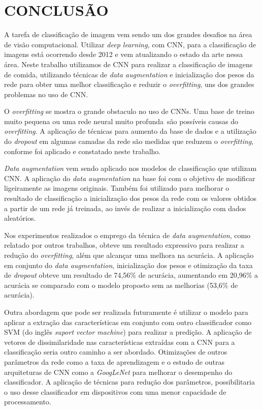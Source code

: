 
\chapter{CONCLUSÃO}
\label{chap:conclusao}

A tarefa de classificação de imagem vem sendo um dos grandes desafios na área de visão computacional. Utilizar \textit{deep learning}, com CNN, para a classificação de imagens está ocorrendo desde 2012 e vem atualizando o estado da arte nessa área. Neste trabalho utilizamos de CNN para realizar a classificação de imagens de comida, utilizando técnicas de \textit{data augmentation} e inicialização dos pesos da rede para obter uma melhor classificação e reduzir o \textit{overfitting}, uns dos grandes problemas no uso de CNN.
\par O \textit{overfitting} se mostra o grande obstaculo no uso de CNNs. Uma base de treino muito pequena ou uma rede neural muito profunda~são possíveis causas do \textit{overfitting}. A aplicação de técnicas para aumento da base de dados e a utilização do \textit{dropout} em algumas camadas da rede são medidas que reduzem o \textit{overfitting}, conforme foi aplicado e constatado neste trabalho.
\par \textit{Data augmentation} vem sendo aplicado nos modelos de classificação que utilizam CNN. A aplicação do \textit{data augmentation} na base foi com o objetivo de modificar ligeiramente as imagens originais. Também foi utilizado para melhorar o resultado de classificação a inicialização dos pesos da rede com os valores obtidos a partir de um rede já treinada, ao invés de realizar a inicialização com dados aleatórios.   
\par Nos experimentos realizados o emprego da técnica de \textit{data augmentation}, como relatado por outros trabalhos, obteve um resultado expressivo para realizar a redução do \textit{overfitting}, além que alcançar uma melhora na acurácia. A aplicação em conjunto do \textit{data augmentation}, inicialização dos pesos e otimização da taxa de \textit{dropout} obteve um resultado de 74,56\% de acurácia, aumentando em 20,96\% a acurácia se comparado com o modelo proposto sem as melhorias (53,6\% de acurácia).
\par Outra abordagem que pode ser realizada futuramente é utilizar o modelo para aplicar a extração das características em conjunto com outro classificador como SVM (do inglês \textit{suport vector machine}) para realizar a predição. A aplicação de vetores de dissimilaridade nas características extraídas com a CNN para a classificação seria outro caminho a ser abordado. Otimizações de outros parâmetros da rede como a taxa de aprendizagem e o estudo de outras arquiteturas de CNN como a \textit{GoogLeNet} \cite{szegedy2015going} para melhorar o desempenho do classificador. A aplicação de técnicas para redução dos parâmetros, possibilitaria o uso desse classificador em dispositivos com uma menor capacidade de processamento.